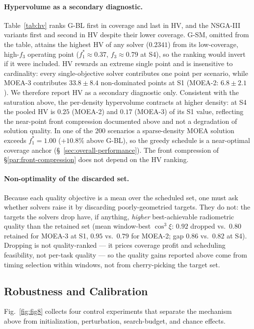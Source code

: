 \documentclass[preprint,12pt,authoryear]{elsarticle}
\begin{document}
\paragraph{Hypervolume as a secondary diagnostic.}\label{par:hv-diagnostic}
Table~\ref{tab:hv} ranks G-BL first in coverage and last in HV, and the
NSGA-III variants first and second in HV despite their lower coverage. G-SM,
omitted from the table, attains the highest HV of any solver ($0.2341$) from
its low-coverage, high-$f_3$ operating point ($f_1^* \approx 0.37$,
$f_3 \approx 0.79$ at S4), so the ranking would invert if it were included. HV
rewards an extreme single point and is insensitive to cardinality: every
single-objective solver contributes one point per scenario, while MOEA-3
contributes $33.8 \pm 8.4$ non-dominated points at S1 (MOEA-2: $6.8 \pm 2.1$).
We therefore report HV as a secondary diagnostic only. Consistent with the
saturation above, the per-density hypervolume contracts at higher density:
at S4 the pooled HV is $0.25$ (MOEA-2) and $0.17$ (MOEA-3) of its S1 value,
reflecting the near-point front compression documented above and not a
degradation of solution quality. In one of the 200
scenarios a sparse-density MOEA solution exceeds $f_1^*=1.00$ ($+10.8\%$ above
G-BL), so the greedy schedule is a near-optimal coverage anchor
(\S~\ref{sec:overall-performance}). The front compression of
\S\ref{par:front-compression} does not depend on the HV ranking.

\paragraph{Non-optimality of the discarded set.}\label{par:non-optimality}
Because each quality objective is a mean over the scheduled set, one
must ask whether solvers raise it
by discarding poorly-geometried targets. They do not: the targets the solvers
drop have, if anything, \emph{higher} best-achievable radiometric quality than
the retained set (mean window-best $\cos^3\xi$: $0.92$ dropped vs.\ $0.80$
retained for MOEA-3 at S1, $0.95$ vs.\ $0.79$ for MOEA-2; gap $0.86$ vs.\
$0.82$ at S4). Dropping is not quality-ranked --- it prices coverage profit
and scheduling feasibility, not per-task quality --- so the quality gains
reported above come from timing selection within windows, not from
cherry-picking the target set.



\subsection{Robustness and Calibration}
\label{sec:robustness-calibration}
Fig.~\ref{fig:fig8} collects four control experiments that separate the
mechanism above from initialization, perturbation, search-budget, and chance
effects.
\end{document}
